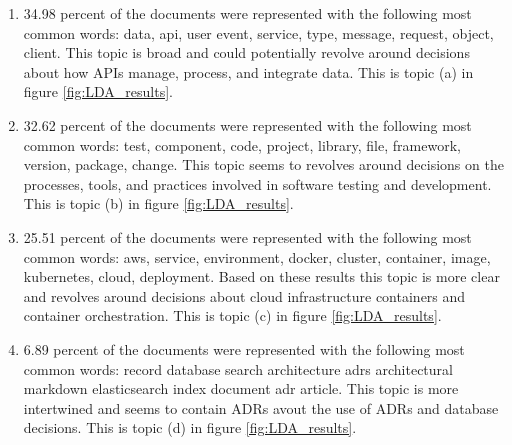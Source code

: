         \begin{enumerate}
            \item 34.98 percent of the documents were represented with the following most common words: data, api, user event, service, type, message, request, object, client. This topic is broad and could potentially revolve around decisions about how APIs manage, process, and integrate data. This is topic (a) in figure \ref{fig:LDA_results}.
            
            \item 32.62 percent of the documents were represented with the following most common words: test, component, code, project, library, file, framework, version, package, change. This topic seems to revolves around decisions on the processes, tools, and practices involved in software testing and development. This is topic (b) in figure \ref{fig:LDA_results}.
    
            \item 25.51 percent of the documents were represented with the following most common words: aws, service, environment, docker, cluster, container, image, kubernetes, cloud, deployment. Based on these results this topic is more clear and revolves around decisions about cloud infrastructure containers and container orchestration. This is topic (c) in figure \ref{fig:LDA_results}.
    
            \item 6.89 percent of the documents were represented with the following most common words: record database search architecture adrs architectural markdown elasticsearch index document adr article. This topic is more intertwined and seems to contain ADRs avout the use of ADRs and database decisions. This is topic (d) in figure \ref{fig:LDA_results}.
        \end{enumerate}

